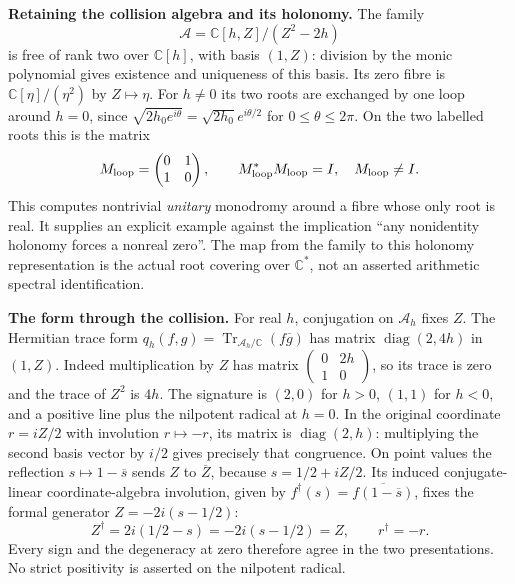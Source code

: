 \EH\textbf{Retaining the collision algebra and its holonomy.}
The family
\[
 \mathcal A=\mathbb C[h,Z]/(Z^2-2h)
\]
is free of rank two over $\mathbb C[h]$, with basis $(1,Z)$: division
by the monic polynomial gives existence and uniqueness of this basis.
Its zero fibre is $\mathbb C[\eta]/(\eta^2)$ by $Z\mapsto\eta$.
For $h\ne0$ its two roots are exchanged by one loop around $h=0$,
since $\sqrt{2h_0e^{i\theta}}=\sqrt{2h_0}e^{i\theta/2}$ for
$0\le\theta\le2\pi$. On the two labelled roots this is the matrix
\[
 M_{\rm loop}=\begin{pmatrix}0&1\\1&0\end{pmatrix},\qquad
 M_{\rm loop}^*M_{\rm loop}=I,\quad M_{\rm loop}\ne I.
\]
This computes nontrivial \emph{unitary} monodromy around a fibre whose
only root is real. It supplies an explicit example against the implication
``any nonidentity holonomy forces a nonreal zero''. The map from the
family to this holonomy representation is the actual root covering over
$\mathbb C^*$, not an asserted arithmetic spectral identification.

\EH\textbf{The form through the collision.}
For real $h$, conjugation on $\mathcal A_h$ fixes $Z$. The Hermitian
trace form $q_h(f,g)=\operatorname{Tr}_{\mathcal A_h/\mathbb C}
(f\overline g)$ has matrix $\operatorname{diag}(2,4h)$ in $(1,Z)$.
Indeed multiplication by $Z$ has matrix
$\left(\begin{smallmatrix}0&2h\\1&0\end{smallmatrix}\right)$,
so its trace is zero and the trace of $Z^2$ is $4h$.
The signature is $(2,0)$ for $h>0$, $(1,1)$ for $h<0$, and a positive
line plus the nilpotent radical at $h=0$. In the original coordinate
$r=iZ/2$ with involution $r\mapsto-r$, its matrix is
$\operatorname{diag}(2,h)$: multiplying the second basis vector by
$i/2$ gives precisely that congruence. On point values the reflection
$s\mapsto1-\overline s$ sends $Z$ to $\overline Z$, because
$s=1/2+iZ/2$. Its induced conjugate-linear coordinate-algebra
involution, given by $f^\dagger(s)=\overline{f(1-\overline s)}$,
fixes the formal generator $Z=-2i(s-1/2)$:
\[
 Z^\dagger=2i(1/2-s)=-2i(s-1/2)=Z,
 \qquad r^\dagger=-r.
\]
Every sign and the degeneracy at zero therefore agree in the two
presentations. No strict positivity is asserted on the nilpotent radical.

